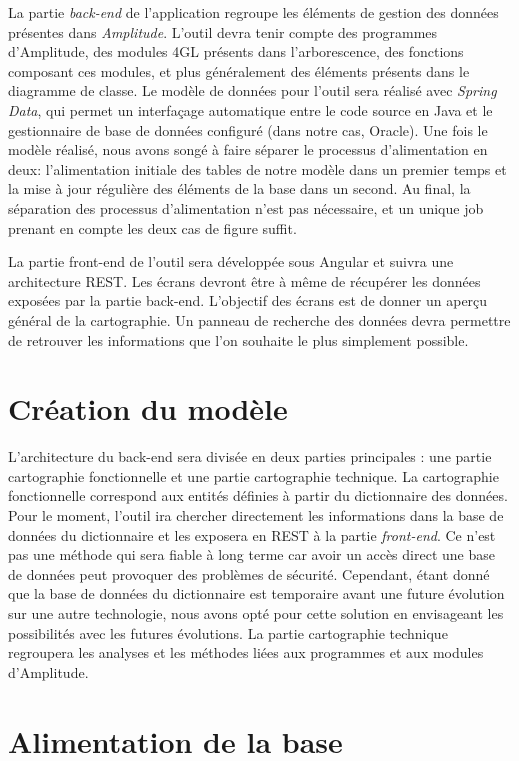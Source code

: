 \documentclass{polytech/polytech}
\begin{document}
La partie \textit{back-end} de l’application regroupe les éléments de gestion des données présentes dans \textit{Amplitude}. L’outil devra tenir compte des programmes d’Amplitude, des modules 4GL présents dans l’arborescence, des fonctions composant ces modules, et plus généralement des éléments présents dans le diagramme de classe. Le modèle de données pour l’outil sera réalisé avec \textit{Spring Data}, qui permet un interfaçage automatique entre le code source en Java et le gestionnaire de base de données configuré (dans notre cas, Oracle). Une fois le modèle réalisé, nous avons songé à faire séparer le processus d'alimentation en deux: l’alimentation initiale des tables de notre modèle dans un premier temps et la mise à jour régulière des éléments de la base dans un second. Au final, la séparation des processus d'alimentation n'est pas nécessaire, et un unique job prenant en compte les deux cas de figure suffit.

La partie front-end de l’outil sera développée sous Angular et suivra une architecture REST. Les écrans devront être à même de récupérer les données exposées par la partie back-end. L’objectif des écrans est de donner un aperçu général de la cartographie. Un panneau de recherche des données devra permettre de retrouver les informations que l’on souhaite le plus simplement possible. 


\section{Création du modèle}

L’architecture du back-end sera divisée en deux parties principales : une partie cartographie fonctionnelle et une partie cartographie technique. La cartographie fonctionnelle correspond aux entités définies à partir du dictionnaire des données. Pour le moment, l’outil ira chercher directement les informations dans la base de données du dictionnaire et les exposera en REST à la partie \textit{front-end}. Ce n'est pas une méthode qui sera fiable à long terme car avoir un accès direct une base de données peut provoquer des problèmes de sécurité. Cependant, étant donné que la base de données du dictionnaire est temporaire avant une future évolution sur une autre technologie, nous avons opté pour cette solution en envisageant les possibilités avec les futures évolutions. La partie cartographie technique regroupera les analyses et les méthodes liées aux programmes et aux modules d’Amplitude. 


\section{Alimentation de la base}
\end{document}
